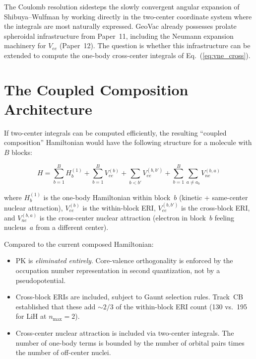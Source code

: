 \documentclass[aps,pra,twocolumn,superscriptaddress,longbibliography]{revtex4-2}
\begin{document}
The Coulomb resolution sidesteps the slowly convergent angular
expansion of Shibuya--Wulfman by working directly in the two-center
coordinate system where the integrals are most naturally expressed.
GeoVac already possesses prolate spheroidal infrastructure from
Paper~11, including the Neumann expansion machinery for $V_{ee}$
(Paper~12).  The question is whether this infrastructure can be
extended to compute the one-body cross-center integrals of
Eq.~(\ref{eq:vne_cross}).


\section{The Coupled Composition Architecture}
\label{sec:architecture}

If two-center integrals can be computed efficiently, the resulting
``coupled composition'' Hamiltonian would have the following structure
for a molecule with $B$ blocks:

\begin{equation}
\label{eq:coupled}
H = \sum_{b=1}^{B} H_b^{(1)} + \sum_{b=1}^{B} V_{ee}^{(b)} +
\sum_{b < b'} V_{ee}^{(b,b')} + \sum_{b=1}^{B} \sum_{a \ne a_b}
V_{ne}^{(b,a)}
\end{equation}

where $H_b^{(1)}$ is the one-body Hamiltonian within block~$b$
(kinetic + same-center nuclear attraction), $V_{ee}^{(b)}$ is the
within-block ERI, $V_{ee}^{(b,b')}$ is the cross-block ERI, and
$V_{ne}^{(b,a)}$ is the cross-center nuclear attraction (electron in
block~$b$ feeling nucleus~$a$ from a different center).

Compared to the current composed Hamiltonian:
\begin{itemize}
\item PK is \emph{eliminated entirely}.  Core-valence orthogonality is
  enforced by the occupation number representation in second
  quantization, not by a pseudopotential.
\item Cross-block ERIs are included, subject to Gaunt selection rules.
  Track~CB established that these add ${\sim}2/3$ of the within-block
  ERI count (130 vs.~195 for LiH at $n_{\max} = 2$).
\item Cross-center nuclear attraction is included via two-center
  integrals.  The number of one-body terms is bounded by the number
  of orbital pairs times the number of off-center nuclei.
\end{itemize}
\end{document}
